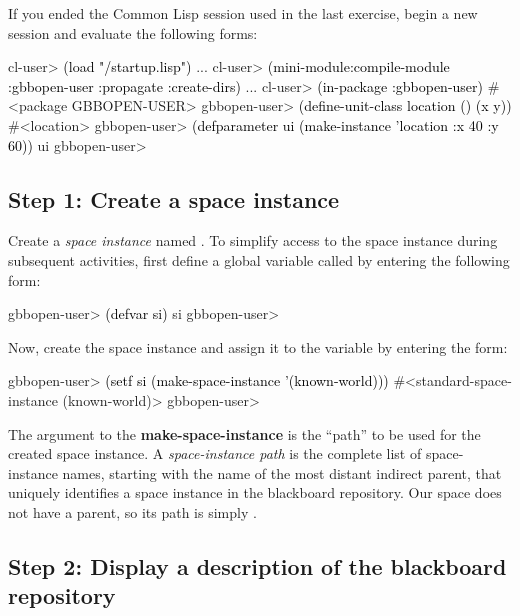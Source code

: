 \documentclass[10pt,twoside,english,pdftex]{article}
\begin{document}
%
%
%
If you ended the Common Lisp session used in the last exercise, begin a new
session and evaluate the following forms:
%
\W\supp
\begin{example}
\textcolor{darkergray}{%
  cl-user> \textcolor{black}{(load "/startup.lisp")}
     ...
  cl-user> \textcolor{black}{(mini-module:compile-module :gbbopen-user :propagate :create-dirs)}
     ...
  cl-user> \textcolor{black}{(in-package :gbbopen-user)}
  #<package GBBOPEN-USER>
  gbbopen-user> \textcolor{black}{(define-unit-class location ()
                  (x y))}
  #<location>
  gbbopen-user> \textcolor{black}{(defparameter ui (make-instance 'location :x 40 :y 60))}
  ui
  gbbopen-user>}
\end{example}

\subsection*{Step 1: Create a space instance}

%
%
Create a \textit{space instance\/} named .  To simplify
access to the space instance during subsequent activities, first define a
global variable called  by entering the following form:
%
\W\supp
\begin{example}
\textcolor{darkergray}{%
  gbbopen-user> \textcolor{black}{(defvar si)}
  si
  gbbopen-user>}
\end{example}

%
Now, create the space instance and assign it to the variable  by
entering the form:
%
\W\supp
\begin{example}
\textcolor{darkergray}{%
  gbbopen-user> \textcolor{black}{(setf si (make-space-instance '(known-world)))}
  #<standard-space-instance (known-world)>
  gbbopen-user>}
\end{example}

The argument to the \textbf{make-space-instance} is the ``path'' to be used
for the created space instance.  A \textit{space-instance path} is the
complete list of space-instance names, starting with the name of the most
distant indirect parent, that uniquely identifies a space instance in the
blackboard repository.  Our  space does not have a parent,
so its path is simply .

\subsection*{Step 2: Display a description of the blackboard repository}
\end{document}
